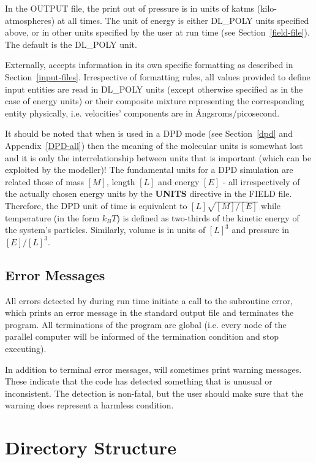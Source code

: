  In the \D OUTPUT file, the print out of
pressure is in units of katms
(kilo-atmospheres) at all times.  The unit of energy is either
DL\_POLY units specified above, or in other units specified by the
user at run time (see Section~\ref{field-file}).  The default is the
DL\_POLY unit.

Externally, \D accepts information in its own specific formatting
as described in Section~\ref{input-files}.  Irrespective of formatting
rules, all values provided to define input entities are read in
DL\_POLY units (except otherwise specified as in the case of energy
units) or their composite mixture representing the corresponding
entity physically, i.e. velocities' components are in \AA ngsroms/picosecond.

 It should be noted that when \D is used
in a DPD mode (see Section~\ref{dpd} and Appendix~\ref{DPD-all})
then the meaning of the molecular units is somewhat lost and it is
only the interrelationship between units that is important (which
can be exploited by the modeller)!  The fundamental units for a DPD
simulation are related those of mass $[M]$, length $[L]$ and energy
$[E]$ - all irrespectively of the actually chosen energy units by
the {\bf UNITS} directive in the FIELD file.  Therefore, the DPD
unit of time is equivalent to $[L]\sqrt{[M]/[E]}$ while temperature
(in the form $k_{B}T$) is defined as two-thirds of the kinetic
energy of the system's particles.  Similarly, volume is in units
of $[L]^{3}$ and pressure in $[E]/[L]^{3}$.

\subsection{Error Messages}

All errors detected by \D during run time initiate a call to the
subroutine {\sc error}, which prints an error message in the
standard output file and terminates the program.  All terminations
of the program are global (i.e. every node of the parallel
computer will be informed of the termination condition and stop
executing).

In addition to terminal error messages, \D will sometimes print
warning messages.  These indicate that the code has detected
something that is unusual or inconsistent.  The detection is
non-fatal, but the user should make sure that the warning does
represent a harmless condition.

\section{Directory Structure}
\label{directory-structure}

